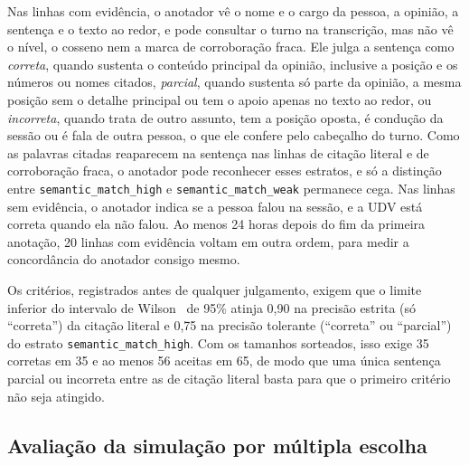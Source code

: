 Nas linhas com evidência, o anotador vê o nome e o cargo da pessoa, a opinião, a sentença e o texto ao
redor, e pode consultar o turno na transcrição, mas não vê o nível, o cosseno nem a marca de
corroboração fraca. Ele julga a sentença como \emph{correta}, quando sustenta o conteúdo principal da
opinião, inclusive a posição e os números ou nomes citados, \emph{parcial}, quando sustenta só parte da
opinião, a mesma posição sem o detalhe principal ou tem o apoio apenas no texto ao redor, ou
\emph{incorreta}, quando trata de outro assunto, tem a posição oposta, é condução da sessão ou é fala
de outra pessoa, o que ele confere pelo cabeçalho do turno. Como as palavras citadas reaparecem na
sentença nas linhas de citação literal e de corroboração fraca, o anotador pode reconhecer esses
estratos, e só a distinção entre \texttt{semantic\_match\_high} e \texttt{semantic\_match\_weak}
permanece cega. Nas linhas sem evidência, o anotador indica se a pessoa falou na sessão, e a UDV está
correta quando ela não falou. Ao menos 24 horas depois do fim da primeira anotação, 20 linhas com
evidência voltam em outra ordem, para medir a concordância do anotador consigo mesmo.

Os critérios, registrados antes de qualquer julgamento, exigem que o limite inferior do intervalo de
Wilson~\citep{wilson1927probable} de 95\% atinja 0,90 na precisão estrita (só ``correta'') da citação
literal e 0,75 na precisão tolerante (``correta'' ou ``parcial'') do estrato
\texttt{semantic\_match\_high}. Com os tamanhos sorteados, isso exige 35 corretas em 35 e ao menos 56
aceitas em 65, de modo que uma única sentença parcial ou incorreta entre as de citação literal basta
para que o primeiro critério não seja atingido.

\subsection{Avaliação da simulação por múltipla escolha}
\label{sec:setup-simulacao}



